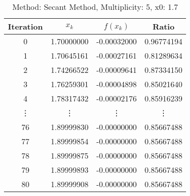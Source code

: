 \begin{table}
\centering
\caption{Method: Secant Method, Multiplicity: 5, x0: 1.7}
\label{tab:table_Secant_Method_5_1_7}
\begin{tabular}{c c c c}
\toprule
Iteration &      $x_k$ &    $f(x_k)$ &      Ratio \\
\midrule
        0 & 1.70000000 & -0.00032000 & 0.96774194 \\
        1 & 1.70645161 & -0.00027161 & 0.81289634 \\
        2 & 1.74266522 & -0.00009641 & 0.87334150 \\
        3 & 1.76259301 & -0.00004898 & 0.85021640 \\
        4 & 1.78317432 & -0.00002176 & 0.85916239 \\
   \vdots &     \vdots &      \vdots &     \vdots \\
       76 & 1.89999830 & -0.00000000 & 0.85667488 \\
       77 & 1.89999854 & -0.00000000 & 0.85667488 \\
       78 & 1.89999875 & -0.00000000 & 0.85667488 \\
       79 & 1.89999893 & -0.00000000 & 0.85667488 \\
       80 & 1.89999908 & -0.00000000 & 0.85667488 \\
\bottomrule
\end{tabular}
\end{table}
